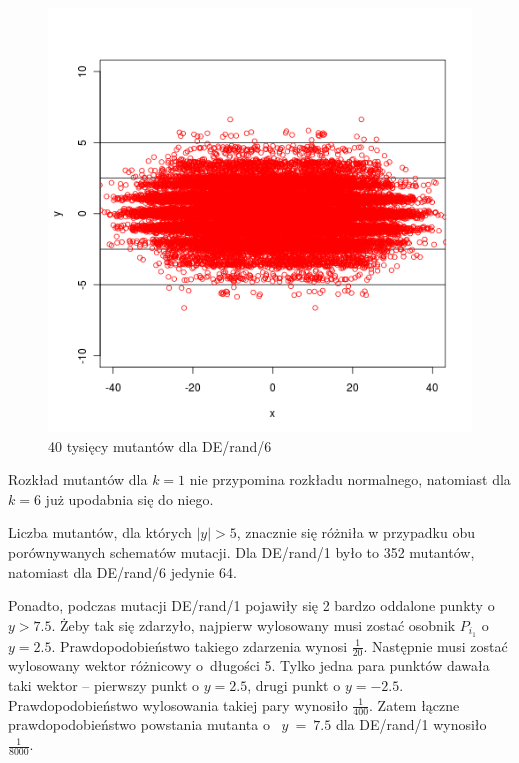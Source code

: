 \documentclass[a4paper,onecolumn,oneside,12pt,wide,floatssmall]{mwrep}
\theoremstyle{definition}
\theoremstyle{plain}%
\theoremstyle{remark}
\begin{document}
\begin{figure}[H]
\centering
\includegraphics[width=.65\textwidth]{img/rand6}
\caption{40 tysięcy mutantów dla DE/rand/6} 
\label{fig:10k_rand6}
\end{figure}

Rozkład mutantów dla $k = 1$ nie przypomina rozkładu normalnego, 
natomiast dla $k = 6$ już upodabnia się do niego.

Liczba mutantów, dla których $|y| > 5$, 
znacznie się różniła w przypadku obu porównywanych schematów mutacji. 
Dla DE/rand/1 było to 352 mutantów,
natomiast dla DE/rand/6 jedynie 64. 

Ponadto, podczas mutacji DE/rand/1 pojawiły się 2 bardzo oddalone punkty o~$y > 7.5$. 
Żeby tak się zdarzyło, najpierw wylosowany musi zostać osobnik $P_{i_1}$ o~$y=2.5$.
Prawdopodobieństwo takiego zdarzenia wynosi $\frac{1}{20}$.
Następnie musi zostać wylosowany wektor różnicowy o~długości 5. Tylko jedna para punktów 
dawała taki wektor --
pierwszy punkt o $y = 2.5$, drugi punkt o $y = -2.5$. 
Prawdopodobieństwo wylosowania takiej pary wynosiło $\frac{1}{400}$. 
Zatem łączne prawdopodobieństwo powstania mutanta o~
$y~=~7.5$ dla DE/rand/1 wynosiło $\frac{1}{8000}$. 
\end{document}
